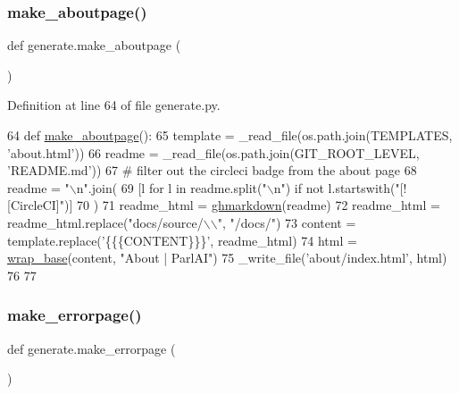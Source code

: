 \subsubsection{\texorpdfstring{make\+\_\+aboutpage()}{make\_aboutpage()}}
{\footnotesize\ttfamily def generate.\+make\+\_\+aboutpage (\begin{DoxyParamCaption}{ }\end{DoxyParamCaption})}



Definition at line 64 of file generate.\+py.


\begin{DoxyCode}
64 \textcolor{keyword}{def }\hyperlink{namespacegenerate_afa732feea0def89a5b9d1a2a6549ee60}{make\_aboutpage}():
65     template = \_read\_file(os.path.join(TEMPLATES, \textcolor{stringliteral}{'about.html'}))
66     readme = \_read\_file(os.path.join(GIT\_ROOT\_LEVEL, \textcolor{stringliteral}{'README.md'}))
67     \textcolor{comment}{# filter out the circleci badge from the about page}
68     readme = \textcolor{stringliteral}{"\(\backslash\)n"}.join(
69         [l \textcolor{keywordflow}{for} l \textcolor{keywordflow}{in} readme.split(\textcolor{stringliteral}{"\(\backslash\)n"}) \textcolor{keywordflow}{if} \textcolor{keywordflow}{not} l.startswith(\textcolor{stringliteral}{"[![CircleCI]"})]
70     )
71     readme\_html = \hyperlink{namespacegenerate_a7811fd26fa2e3aeec0e3d3851cdda546}{ghmarkdown}(readme)
72     readme\_html = readme\_html.replace(\textcolor{stringliteral}{"docs/source/\(\backslash\)\(\backslash\)"}, \textcolor{stringliteral}{"/docs/"})
73     content = template.replace(\textcolor{stringliteral}{'\{\{\{CONTENT\}\}\}'}, readme\_html)
74     html = \hyperlink{namespacegenerate_adb990cdb948e21150b35af85d236b6be}{wrap\_base}(content, \textcolor{stringliteral}{"About | ParlAI"})
75     \_write\_file(\textcolor{stringliteral}{'about/index.html'}, html)
76 
77 
\end{DoxyCode}
\mbox{\label{namespacegenerate_a1c52bc54613c3a13c908bc65d7911b8e}} 
\subsubsection{\texorpdfstring{make\+\_\+errorpage()}{make\_errorpage()}}
{\footnotesize\ttfamily def generate.\+make\+\_\+errorpage (\begin{DoxyParamCaption}{ }\end{DoxyParamCaption})}



